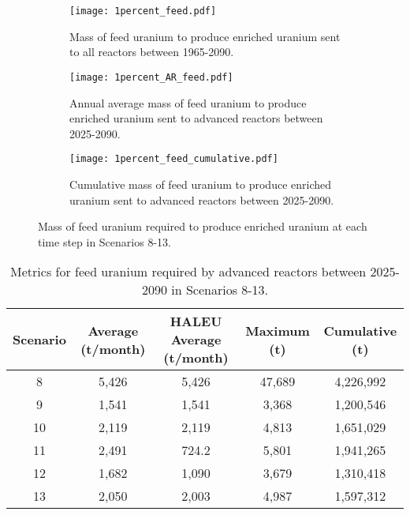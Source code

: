 \begin{figure}[h!]
    \centering
    \begin{subfigure}[b]{0.45\textwidth}
        \centering
        \texttt{[image: 1percent\_feed.pdf]}
        \caption{Mass of feed uranium to produce enriched uranium sent to 
        all reactors between 1965-2090.}
        \label{fig:1percent_all_feed}
    \end{subfigure}
    \hfill
    \begin{subfigure}[b]{0.45\textwidth}
        \centering
        \texttt{[image: 1percent\_AR\_feed.pdf]}
        \caption{Annual average mass of feed uranium to produce enriched 
        uranium sent to advanced reactors between 2025-2090.}
        \label{fig:1percent_AR_feed}
    \end{subfigure}
    \begin{subfigure}[b]{0.45\textwidth}
        \centering
        \texttt{[image: 1percent\_feed\_cumulative.pdf]}
        \caption{Cumulative mass of feed uranium to produce enriched uranium sent to 
        advanced reactors between 2025-2090.}
        \label{fig:1percent_feed_cumulative}
    \end{subfigure}
       \caption{Mass of feed uranium required to produce enriched uranium
       at each time step in Scenarios 8-13.}
       \label{fig:1percent_feed}
\end{figure}

\begin{table}[h!]
    \centering 
    \caption{Metrics for feed uranium required by advanced reactors 
    between 2025-2090 in Scenarios 8-13.}
    \label{tab:1percent_feed}
    \begin{tabular}{c c c c c}
        \hline
        Scenario & Average (t/month) & \gls{HALEU} Average  
        (t/month) & Maximum (t) & Cumulative (t)\\\hline
        8 & 5,426 & 5,426 & 47,689 & 4,226,992\\
        9 & 1,541 & 1,541 & 3,368 & 1,200,546\\
        10 & 2,119 & 2,119 & 4,813 & 1,651,029\\
        11 & 2,491 & 724.2 & 5,801 & 1,941,265\\
        12 & 1,682 & 1,090 & 3,679 & 1,310,418\\
        13 & 2,050 & 2,003 & 4,987 & 1,597,312\\
        \hline
    \end{tabular}
\end{table}

